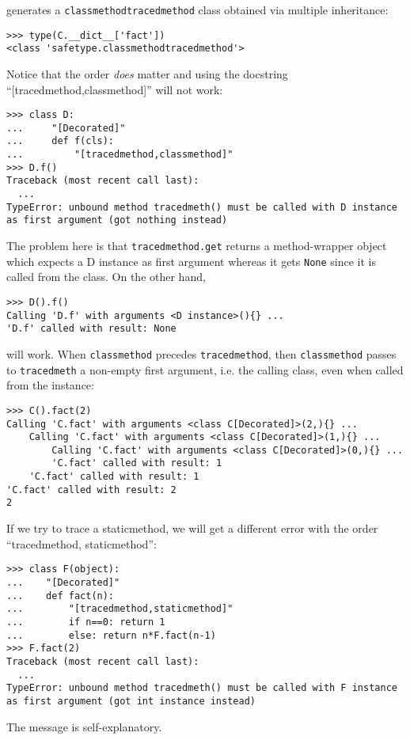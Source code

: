 \documentclass[11pt,english]{article}
\begin{document}
generates a \texttt{classmethodtracedmethod} class obtained via
multiple inheritance:
\begin{verbatim}>>> type(C.__dict__['fact'])
<class 'safetype.classmethodtracedmethod'>\end{verbatim}

Notice that the order \emph{does} matter and using the docstring 
``[tracedmethod,classmethod]'' will not work:
\begin{verbatim}>>> class D:
...     "[Decorated]"
...     def f(cls):
...         "[tracedmethod,classmethod]"
>>> D.f()
Traceback (most recent call last):
  ...
TypeError: unbound method tracedmeth() must be called with D instance 
as first argument (got nothing instead)\end{verbatim}

The problem here is that \texttt{tracedmethod.get} returns a method-wrapper object
which expects a D instance 
as first argument whereas it gets \texttt{None} since
it is called from the class. On the other hand,
\begin{verbatim}>>> D().f()
Calling 'D.f' with arguments <D instance>(){} ...
'D.f' called with result: None\end{verbatim}

will work. When \texttt{classmethod} precedes \texttt{tracedmethod}, then
\texttt{classmethod} passes to \texttt{tracedmeth} a non-empty first argument,
i.e. the calling class, even when called from the instance:
\begin{verbatim}>>> C().fact(2)
Calling 'C.fact' with arguments <class C[Decorated]>(2,){} ...
    Calling 'C.fact' with arguments <class C[Decorated]>(1,){} ...
        Calling 'C.fact' with arguments <class C[Decorated]>(0,){} ...
        'C.fact' called with result: 1
    'C.fact' called with result: 1
'C.fact' called with result: 2
2\end{verbatim}

If we try to trace a staticmethod, we will get a different error with
the order ``tracedmethod, staticmethod'':
\begin{verbatim}>>> class F(object):
...    "[Decorated]"
...    def fact(n):
...        "[tracedmethod,staticmethod]"
...        if n==0: return 1
...        else: return n*F.fact(n-1)
>>> F.fact(2)
Traceback (most recent call last):
  ...
TypeError: unbound method tracedmeth() must be called with F instance 
as first argument (got int instance instead)\end{verbatim}

The message is self-explanatory.
\end{document}
